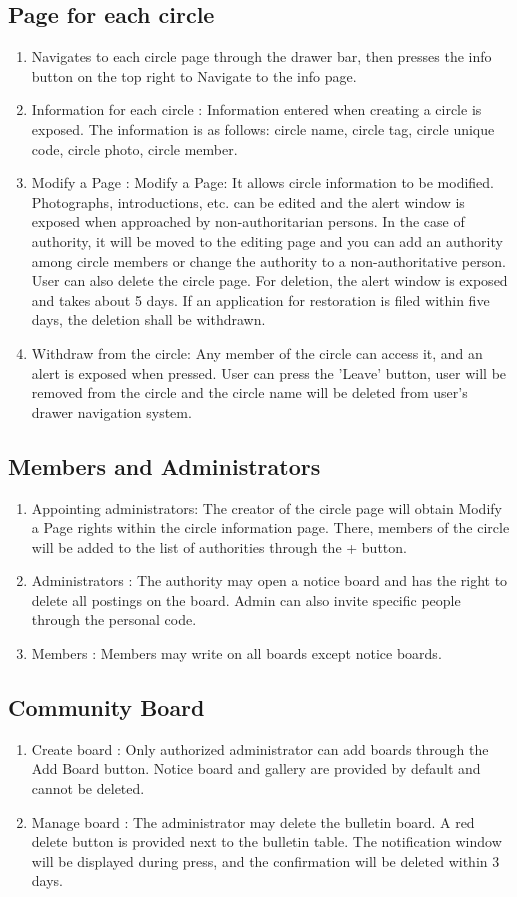 \documentclass[conference]{IEEEtran}
\begin{document}
\subsection{Page for each circle} 
\begin{enumerate}
    \item Navigates to each circle page through the drawer bar, then presses the info button on the top right to Navigate to the info page.
    \item Information for each circle : Information entered when creating a circle is exposed. The information is as follows: circle name, circle tag, circle unique code, circle photo, circle member.
    \item Modify a Page : Modify a Page: It allows circle information to be modified. Photographs, introductions, etc. can be edited and the alert window is exposed when approached by non-authoritarian persons. In the case of authority, it will be moved to the editing page and you can add an authority among circle members or change the authority to a non-authoritative person. User can also delete the circle page. For deletion, the alert window is exposed and takes about 5 days. If an application for restoration is filed within five days, the deletion shall be withdrawn.
    \item Withdraw from the circle: Any member of the circle can access it, and an alert is exposed when pressed. User can press the 'Leave' button, user will be removed from the circle and the circle name will be deleted from user's drawer navigation system.
\end{enumerate}     
\subsection{Members and Administrators}
\begin{enumerate}
    \item Appointing administrators: The creator of the circle page will obtain Modify a Page rights within the circle information page. There, members of the circle will be added to the list of authorities through the + button.
    \item Administrators : The authority may open a notice board and has the right to delete all postings on the board. Admin can also invite specific people through the personal code.
    \item Members : Members may write on all boards except notice boards.
\end{enumerate}
\subsection{Community Board}
\begin{enumerate}
    \item Create board : Only authorized administrator can add boards through the Add Board button. Notice board and gallery are provided by default and cannot be deleted.
    \item Manage board : The administrator may delete the bulletin board. A red delete button is provided next to the bulletin table. The notification window will be displayed during press, and the confirmation will be deleted within 3 days.
\end{enumerate}
\end{document}
